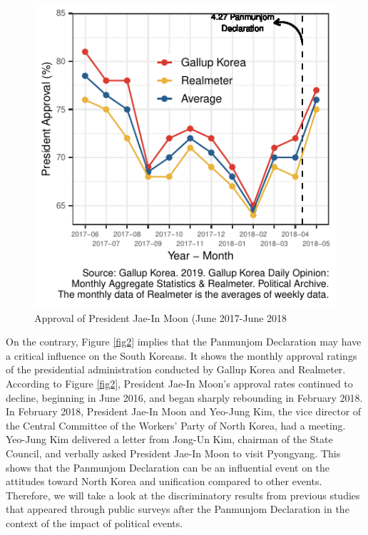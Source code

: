 \documentclass[letterpaper,9pt,twocolumn,twoside,]{pinp}
\begin{document}
\begin{figure}[htbp]

{\centering \includegraphics{manuscript_files/figure-latex/fig2-1} 

}

\caption{\label{fig2} Approval of President Jae-In Moon (June 2017-June 2018}\label{fig:fig2}
\end{figure}

On the contrary, Figure \ref{fig2} implies that the Panmunjom
Declaration may have a critical influence on the South Koreans. It shows
the monthly approval ratings of the presidential administration
conducted by Gallup Korea and Realmeter. According to Figure \ref{fig2},
President Jae-In Moon's approval rates continued to decline, beginning
in June 2016, and began sharply rebounding in February 2018. In February
2018, President Jae-In Moon and Yeo-Jung Kim, the vice director of the
Central Committee of the Workers' Party of North Korea, had a meeting.
Yeo-Jung Kim delivered a letter from Jong-Un Kim, chairman of the State
Council, and verbally asked President Jae-In Moon to visit Pyongyang.
This shows that the Panmunjom Declaration can be an influential event on
the attitudes toward North Korea and unification compared to other
events. Therefore, we will take a look at the discriminatory results
from previous studies that appeared through public surveys after the
Panmunjom Declaration in the context of the impact of political events.
\end{document}
